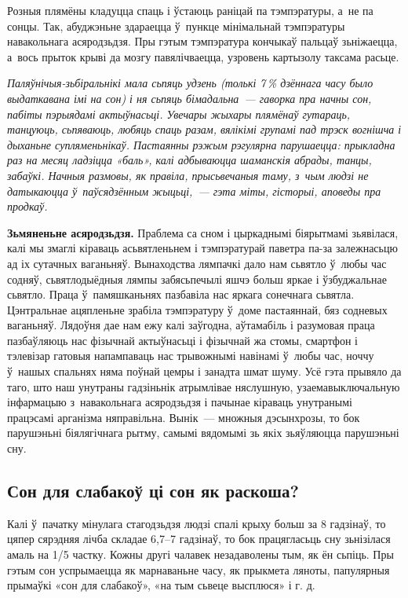 Розныя плямёны кладуцца спаць і ўстаюць раніцай па тэмпэратуры, а~не па сонцы. Так, абуджэньне здараецца ў~пункце мінімальнай тэмпэратуры навакольнага асяродзьдзя. Пры гэтым тэмпэратура кончыкаў пальцаў зьніжаецца, а~вось прыток крыві да мозгу павялічваецца, узровень картызолу таксама расьце.

\emph{Паляўнічыя-зьбіральнікі мала сьпяць удзень (толькі 7\,\% дзённага часу было выдаткавана імі на сон) і ня сьпяць бімадальна~--- гаворка пра начны сон, пабіты пэрыядамі актыўнасьці. Увечары жыхары плямёнаў гутараць, танцуюць, сьпяваюць, любяць спаць разам, вялікімі групамі пад трэск вогнішча і дыханьне супляменьнікаў. Пастаянны рэжым рэгулярна парушаецца: прыкладна раз на месяц ладзіцца «баль», калі адбываюцца шаманскія абрады, танцы, забаўкі. Начныя размовы, як правіла, прысьвечаныя таму, з~чым людзі не датыкаюцца ў~паўсядзённым жыцьці,~--- гэта міты, гісторыі, аповеды пра продкаў.}

\textbf{Зьмяненьне асяродзьдзя.} Праблема са сном і цыркаднымі біярытмамі зьявілася, калі мы змаглі кіраваць асьвятленьнем і тэмпэратурай паветра па-за залежнасьцю ад іх сутачных ваганьняў. Вынаходства лямпачкі дало нам сьвятло ў~любы час содняў, сьвятлодыёдныя лямпы забясьпечылі яшчэ больш яркае і ўзбуджальнае сьвятло. Праца ў~памяшканьнях пазбавіла нас яркага сонечнага сьвятла. Цэнтральнае ацяпленьне зрабіла тэмпэратуру ў~доме пастаяннай, бяз содневых ваганьняў. Лядоўня дае нам ежу калі заўгодна, аўтамабіль і разумовая праца пазбаўляюць нас фізычнай актыўнасьці і фізычнай жа стомы, смартфон і тэлевізар гатовыя напампаваць нас трывожнымі навінамі ў~любы час, ноччу ў~нашых спальнях няма поўнай цемры і занадта шмат шуму. Усё гэта прывяло да таго, што наш унутраны гадзіньнік атрымлівае няслушную, узаемавыключальную інфармацыю з~навакольнага асяродзьдзя і пачынае кіраваць унутранымі працэсамі арганізма няправільна. Вынік~--- множныя дэсынхрозы, то бок парушэньні біялягічнага рытму, самымі вядомымі зь якіх зьяўляюцца парушэньні сну.


\subsection*{Сон для слабакоў ці сон як раскоша?}

Калі ў~пачатку мінулага стагодзьдзя людзі спалі крыху больш за 8 гадзінаў, то цяпер сярэдняя лічба складае 6,7--7 гадзінаў, то бок працягласьць сну зьнізілася амаль на 1/5 частку. Кожны другі чалавек незадаволены тым, як ён сьпіць. Пры гэтым сон успрымаецца як марнаваньне часу, як прыкмета ляноты, папулярныя прымаўкі «сон для слабакоў», «на тым сьвеце высплюся» і г. д.

